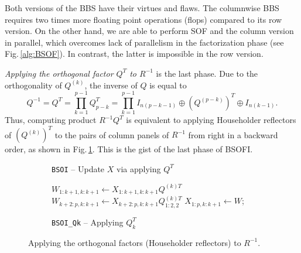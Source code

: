 \documentclass{llncs}
\begin{document}
Both versions of the BBS have their virtues and flaws. 
The columnwise BBS requires 
two times more floating point operations (flops) compared to 
its row version.  On the other hand, 
we are able to perform SOF and the column version in parallel, 
which overcomes lack of parallelism 
in the factorization phase (see Fig.\,\ref{alg:BSOF}).
In contrast, 
the latter is impossible in the row version. %

\textit{Applying the orthogonal factor $Q^T$ to $R^{-1}$} 
is the last phase.
Due to the orthogonality of $Q^{(k)}$, the inverse of $Q$ is equal to 
\begin{equation}
  Q^{-1} = Q^{T} = \prod_{k=1}^{p-1} Q_{p-k}^{T} = 
  \prod_{k=1}^{p-1} I_{n(p-k-1)}\oplus \left(Q^{(p-k)}\right)^{T} \oplus 
  I_{n(k-1)}.
\end{equation}
Thus, computing product $R^{-1} Q^{T}$ is equivalent to
applying Householder reflectors of $\left(Q^{(k)}\right)^{T}$ to 
the pairs of column panels of $R^{-1}$ from right in a backward order, 
as shown in Fig.\,\ref{alg:BSOI_Cycle}. 
This is the gist of the last phase of BSOFI.
\begin{figure}[t]%
  \centering
  \begin{subfigure}[t]{0.49\linewidth}%
    \begin{algorithm}[H]
      \BlankLine

      \BlankLine%
    \end{algorithm}    
    \caption{{\tt BSOI} -- Update $X$ via applying $Q^{T}$
      \label{alg:BSOI_Cycle}}
  \end{subfigure}
  \hfill
  \begin{subfigure}[t]{0.5\linewidth}%
    \begin{algorithm}[H]

      $W_{1:k+1,k:k+1} \gets X_{1:k+1,k:k+1} Q^{(k)T} $\;
      $W_{k+2:p,k:k+1} \gets X_{k+2:p,k:k+1} Q_{1:2,2}^{(k)T}$\;
      $X_{1:p,k:k+1} \gets W$;
    \end{algorithm}    
    \caption{{\tt BSOI\_Qk} -- Applying $Q_k^{T}$
      \label{alg:BSOI_Qk}}
  \end{subfigure}
  \caption{Applying the orthogonal factors (Householder reflectors) to $R^{-1}$.
    \label{alg:BSOI}}
\end{figure}
\end{document}
